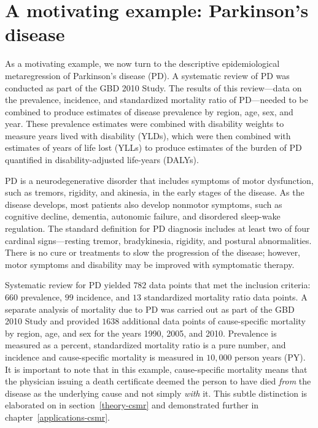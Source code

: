 \section{A motivating example: Parkinson's disease}
\label{intro-complete_ex}

As a motivating example, we now turn to the descriptive
epidemiological metaregression of Parkinson's disease (PD). A
systematic review of PD was conducted as part of the GBD 2010
Study.\cite{TK_GBD_2010_or_parkinsons_paper} The results of this
review---data on the prevalence, incidence, and standardized mortality ratio of
PD---needed to be combined to produce estimates of disease prevalence by
region, age, sex, and year.  These prevalence estimates were combined
with disability weights to measure years lived with disability (YLDs),
which were then combined with estimates of years of life lost (YLLs)
to produce estimates of the burden of PD quantified in disability-adjusted life-years (DALYs).

PD is a neurodegenerative disorder that includes symptoms of motor
dysfunction, such as tremors, rigidity, and akinesia, in the early
stages of the disease.  As the disease develops, most patients also
develop nonmotor symptoms, such as cognitive decline, dementia,
autonomic failure, and disordered sleep-wake regulation.  The standard
definition for PD diagnosis includes at least two of four cardinal
signs---resting tremor, bradykinesia, rigidity, and postural abnormalities.
There is no cure or treatments to slow the progression of the disease;
however, motor symptoms and disability may be improved with
symptomatic therapy.\cite{poewe_natural_2006, pollock_prevalence_1966, larsen_clinical_1994}

Systematic review for PD yielded $782$ data points that met the inclusion criteria: $660$
prevalence, $99$ incidence, and $13$ standardized mortality ratio data
points.  A separate analysis of
mortality due to PD was carried out as part of the GBD 2010 Study and
provided $1638$ additional data points of cause-specific mortality by
region, age, and sex for the years 1990, 2005, and 2010.  Prevalence
is measured as a percent, standardized mortality ratio is a pure number, and
incidence and cause-specific mortality is measured in $10,000$ person
years (PY).  It is important to note that in this example, cause-specific mortality means
that the physician issuing a death certificate deemed the person to
have died \emph{from} the disease as the underlying cause and not
simply \emph{with} it.  This subtle distinction is elaborated on in
section~\ref{theory-csmr} and demonstrated further in
chapter~\ref{applications-csmr}.

